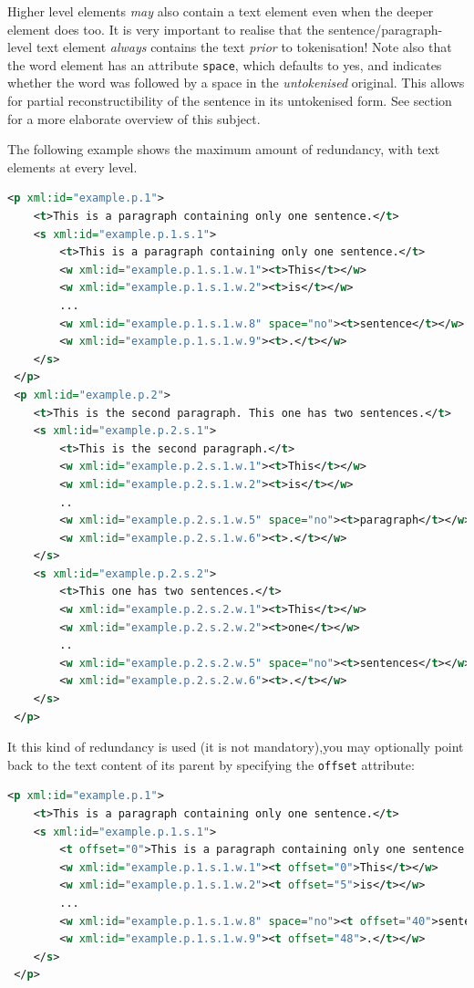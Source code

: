 \documentclass[a4paper,12pt]{report}
\begin{document}
Higher level elements \emph{may} also contain a text element even when the deeper element does too. It is very important to realise that the sentence/paragraph-level text element \emph{always} contains the text \emph{prior} to tokenisation! Note also that the word element has an attribute \texttt{space}, which defaults to yes, and indicates whether the word was followed by a space in the \emph{untokenised} original. This allows for partial reconstructibility of the sentence in its untokenised form. See section~\label{sec:textcontent} for a more elaborate overview of this subject.

The following example shows the maximum amount of redundancy, with text elements at every level.

\begin{lstlisting}[language=xml]
 <p xml:id="example.p.1">
    <t>This is a paragraph containing only one sentence.</t>
    <s xml:id="example.p.1.s.1">        
        <t>This is a paragraph containing only one sentence.</t>
        <w xml:id="example.p.1.s.1.w.1"><t>This</t></w>
        <w xml:id="example.p.1.s.1.w.2"><t>is</t></w>
        ...
        <w xml:id="example.p.1.s.1.w.8" space="no"><t>sentence</t></w>
        <w xml:id="example.p.1.s.1.w.9"><t>.</t></w>
    </s>
 </p>
 <p xml:id="example.p.2">
    <t>This is the second paragraph. This one has two sentences.</t>
    <s xml:id="example.p.2.s.1">
        <t>This is the second paragraph.</t>
        <w xml:id="example.p.2.s.1.w.1"><t>This</t></w>
        <w xml:id="example.p.2.s.1.w.2"><t>is</t></w>    
        ..
        <w xml:id="example.p.2.s.1.w.5" space="no"><t>paragraph</t></w>    
        <w xml:id="example.p.2.s.1.w.6"><t>.</t></w>    
    </s>
    <s xml:id="example.p.2.s.2">
        <t>This one has two sentences.</t>
        <w xml:id="example.p.2.s.2.w.1"><t>This</t></w>
        <w xml:id="example.p.2.s.2.w.2"><t>one</t></w>    
        ..
        <w xml:id="example.p.2.s.2.w.5" space="no"><t>sentences</t></w>    
        <w xml:id="example.p.2.s.2.w.6"><t>.</t></w>    
    </s>
 </p>
\end{lstlisting}

It this kind of redundancy is used (it is not mandatory),you may optionally point back to the text content of its parent by specifying the \texttt{offset} attribute:

\begin{lstlisting}[language=xml]
 <p xml:id="example.p.1">
    <t>This is a paragraph containing only one sentence.</t>
    <s xml:id="example.p.1.s.1">        
        <t offset="0">This is a paragraph containing only one sentence.</t>
        <w xml:id="example.p.1.s.1.w.1"><t offset="0">This</t></w>
        <w xml:id="example.p.1.s.1.w.2"><t offset="5">is</t></w>
        ...
        <w xml:id="example.p.1.s.1.w.8" space="no"><t offset="40">sentence</t></w>
        <w xml:id="example.p.1.s.1.w.9"><t offset="48">.</t></w>
    </s>
 </p>
\end{lstlisting}
\end{document}
